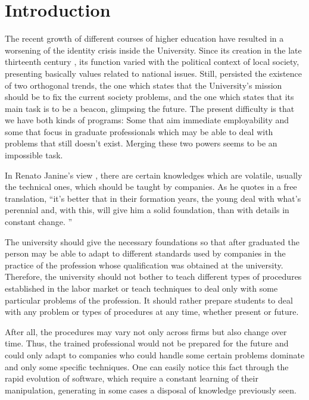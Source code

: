 \documentclass[conference]{IEEEtran}
\begin{document}
\section{Introduction}
	The recent growth of different courses of higher education have resulted in a worsening of the identity crisis inside the University. Since its creation in the late thirteenth century \cite{oliveira:origem_universidades}, its function varied with the political context of local society, presenting basically values related to national issues. Still, persisted the existence of two orthogonal trends, the one which states that the University's mission should be to fix the current society problems, and the one which states that its main task is to be a beacon, glimpsing the future. The present difficulty is that we have both kinds of programs: Some that aim immediate employability and some that focus in graduate professionals which may be able to deal with problems that still doesn't exist. Merging these two powers seems to be an impossible task.

	In Renato Janine's view \cite{ribeiro:universidade_vida_atual}, there are certain knowledges which are volatile, usually the technical ones, which should be taught by companies. As he quotes in a free translation, ``it's better that in their formation years, the young deal with what's perennial and, with this, will give him a solid foundation, than with details in constant change. ''

	The university should give the necessary foundations so that after graduated the person may be able to adapt to different standards used by companies in the practice of the profession whose qualification was obtained at the university. Therefore, the university should not bother to teach different types of procedures established in the labor market or teach techniques to deal only with some particular problems of the profession. It should rather prepare students to deal with any problem or types of procedures at any time, whether present or future.

	After all, the procedures may vary not only across firms but also change over time. Thus, the trained professional would not be prepared for the future and could only adapt to companies who could handle some certain problems dominate and only some specific techniques. One can easily notice this fact through the rapid evolution of software, which require a constant learning of their manipulation, generating in some cases a disposal of knowledge previously seen.
\end{document}
